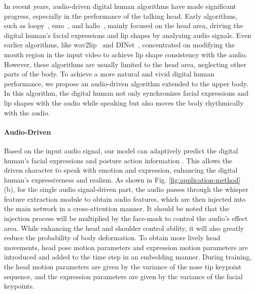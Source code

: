 In recent years, audio-driven digital human algorithms have made significant progress, especially in the performance of the talking head. Early algorithms, such as loopy~\cite{ye2024mimic}, emo~\cite{tian2024emo}, and hallo~\cite{xu2024hallo}, mainly focused on the head area, driving the digital human's facial expressions and lip shapes by analyzing audio signals. Even earlier algorithms, like wav2lip~\cite{prajwal2020lip} and DINet~\cite{zhang2023dinet}, concentrated on modifying the mouth region in the input video to achieve lip shape consistency with the audio. However, these algorithms are usually limited to the head area, neglecting other parts of the body. To achieve a more natural and vivid digital human performance, we propose an audio-driven algorithm extended to the upper body. In this algorithm, the digital human not only synchronizes facial expressions and lip shapes with the audio while speaking but also moves the body rhythmically with the audio.

\paragraph{Audio-Driven}
Based on the input audio signal, our model can adaptively predict the digital human's facial expressions and posture action information . This allows the driven character to speak with emotion and expression, enhancing the digital human's expressiveness and realism. 
As shown in  Fig. \ref{fig:application-method} (b), for the single audio signal-driven part, the audio passes through the whisper feature extraction module to obtain audio features, which are then injected into the main network in a cross-attention manner. It should be noted that the injection process will be multiplied by the face-mask to control the audio's effect area. While enhancing the head and shoulder control ability, it will also greatly reduce the probability of body deformation. To obtain more lively head movements, head pose motion parameters and expression motion parameters are introduced and added to the time step in an embedding manner. During training, the head motion parameters are given by the variance of the nose tip keypoint sequence, and the expression parameters are given by the variance of the facial keypoints. 


